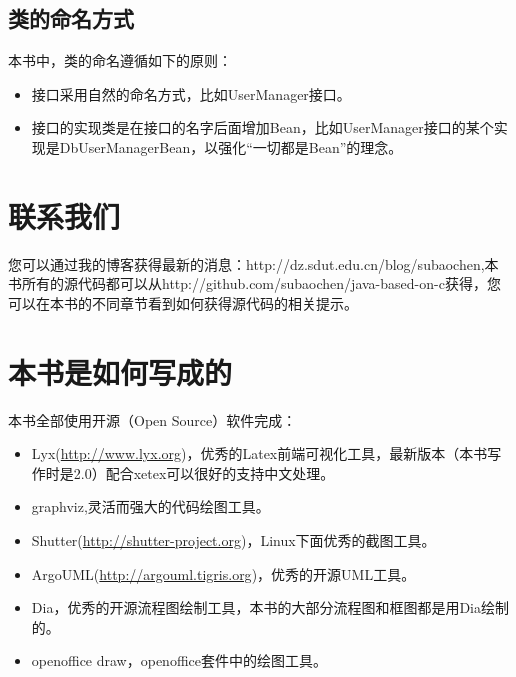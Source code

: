 \subsection*{类的命名方式}
本书中，类的命名遵循如下的原则：
\begin{itemize}
    \item 接口采用自然的命名方式，比如UserManager接口。
    \item 接口的实现类是在接口的名字后面增加Bean，比如UserManager接口的某个实现是DbUserManagerBean，以强化“一切都是Bean”的理念。
\end{itemize}
\section*{联系我们}
您可以通过我的博客获得最新的消息：http://dz.sdut.edu.cn/blog/subaochen,本书所有的源代码都可以从http://github.com/subaochen/java-based-on-c获得，您可以在本书的不同章节看到如何获得源代码的相关提示。

\section*{本书是如何写成的}
本书全部使用开源（Open Source）软件完成：
\begin{itemize}
    \item Lyx(\url{http://www.lyx.org})，优秀的Latex前端可视化工具，最新版本（本书写作时是2.0）配合xetex可以很好的支持中文处理。
    \item graphviz,灵活而强大的代码绘图工具。
    \item Shutter(\url{http://shutter-project.org})，Linux下面优秀的截图工具。
    \item ArgoUML(\url{http://argouml.tigris.org})，优秀的开源UML工具。
    \item Dia，优秀的开源流程图绘制工具，本书的大部分流程图和框图都是用Dia绘制的。
    \item openoffice draw，openoffice套件中的绘图工具。
\end{itemize}
\mainmatter
